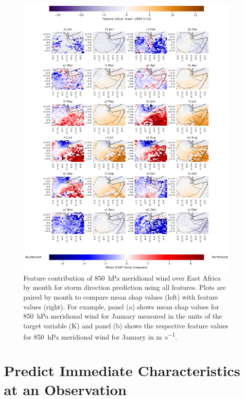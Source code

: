\begin{figure}[ht]
    \centering
    \includegraphics[width=\textwidth]{../figures/generated/experiments/storm_direction/geographic_corr/storm_direction_all_shap_mean_v850_map_by_month.png}
    \caption{Feature contribution of \SI{850}{\hecto\pascal} meridional wind over East Africa by month for storm direction prediction using all features. Plots are paired by month to compare mean \acrshort{shap} values (left) with feature values (right). For example, panel (a) shows mean \acrshort{shap} values for \SI{850}{\hecto\pascal} meridional wind for January measured in the units of the target variable (\unit{\kelvin}) and panel (b) shows the respective feature values for \SI{850}{\hecto\pascal} meridional wind for January in \unit{\meter\per\second}.}
    \label{fig:storm_direction_all_shap_mean_v850_map_by_month}
\end{figure}

\clearpage
\section{Predict Immediate Characteristics at an Observation}

